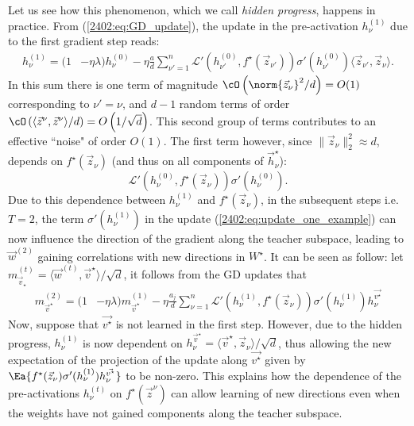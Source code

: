 Let us see how this phenomenon, which we call \textit{hidden progress},  happens in practice.  From (\ref{2402:eq:GD_update}), the update in the pre-activation $h^{(1)}_\nu$ due to the first gradient step reads:
\begin{align}
    h^{(1)}_\nu = (1&-\eta \lambda) h^{(0)}_\nu  -\eta  \frac{a}{d} \sum_{{\nu'}=1}^{n}\mathcal{L}'(h^{(0)}_{\nu'},f^\star(\vec z_{\nu'}))\sigma'(h^{(0)}_{\nu'})\langle \vec z_{\nu'}, \vec z_\nu \rangle . 
\end{align}
In this sum there is one term of magnitude $\cO\left({\norm{\vec z_\nu}^2}/{d}\right)=O(1)$ corresponding to $\nu' = \nu$, and $d-1$ random terms of  order $\cO\left({\langle \vec z^\nu, \vec z^\nu \rangle}{/d}\right)=O\left(1/{\sqrt{d}}\right)$. This second group of terms contributes to an effective ``noise" of order $O(1)$. The first term however, since $\|{\vec z}_{\nu} \|_2^2 \approx d$, depends on $f^\star(\vec z_\nu)$ (and thus on all components of $\vec{h}^\star_{\nu}$):
\begin{equation}\label{2402:eq:hid_prog_term}
    \mathcal{L}'(h^{(0)}_\nu,f^\star(\vec z_\nu))\sigma'({h^{(0)}_\nu}) .
\end{equation}
Due to this dependence between $h^{(1)}_\nu$ and $f^\star(\vec{z}_{\nu})$, in the subsequent steps i.e. $T = 2$, the term $\sigma'(h^{(1)}_\nu)$ in the update (\ref{2402:eq:update_one_example}) can now influence the direction of the gradient along the teacher subspace, leading to $\vec{w}^{(2)}$ gaining correlations with new directions in $W^\star$.  It can be seen as follow: let $m_{\vec{v}_\star}^{(t)} =\langle \vec w^{(t)}, \vec{v}^\star \rangle / \sqrt{d}$, it follows from the GD updates that 
\begin{align}
    m_{\vec{v}^\star}^{(2)}  =  (1&-\eta\lambda)m_{\vec{v}^\star}^{(1)} -\eta  \frac{a_j}{d} \sum_{\nu=1}^{n}\mathcal{L}'(h^{(1)}_\nu,f^\star(\vec z_\nu))\sigma'(h^{(1)}_\nu)h^{\vec{v^\star}}_{\nu}
\end{align}
Now, suppose that $\vec{v^\star}$ is not learned in the first step.
However, due to the hidden progress, $h^{(1)}_\nu$ is now dependent on $h^{\vec{v}^\star}_{\nu} = \langle\vec{v}^\star, \vec{z}_\nu \rangle/\sqrt{d}$, thus allowing the new expectation of the projection of the update along $\vec{v^\star}$ given by $\Ea{f^\star(\vec z_\nu)\sigma'(h^{(1)}_\nu)h^{\vec{v^\star}}_{\nu}}$ to be non-zero. This explains how the dependence of the pre-activations $h^{(t)}_\nu$ on $f^\star(\vec z^\nu)$ can allow learning of new directions even when the weights have not gained components along the teacher subspace.

